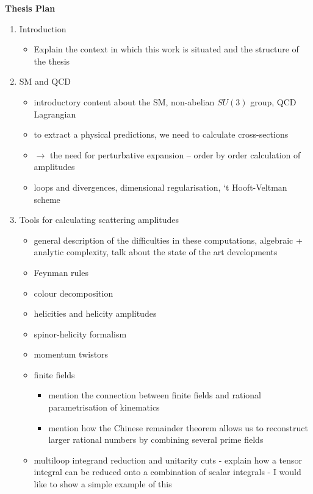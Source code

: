 \documentclass[main.tex]{subfiles}
\begin{document}
\centering
\textbf{Thesis Plan}
\begin{enumerate}
    \item Introduction
    \begin{itemize}
        \item Explain the context in which this work is situated and the structure of the thesis
    \end{itemize}
    \item SM and QCD
    \begin{itemize}
        \item introductory content about the SM, non-abelian $SU(3)$ group, QCD Lagrangian
        \item to extract a physical predictions, we need to calculate cross-sections
        \item $\rightarrow$ the need for perturbative expansion -- order by order calculation of amplitudes
        \item loops and divergences, dimensional regularisation, `t Hooft-Veltman scheme
    \end{itemize}
    \item Tools for calculating scattering amplitudes
    \begin{itemize}
        \item general description of the difficulties in these computations, algebraic + analytic complexity, talk about the state of the art developments
        \item Feynman rules
        \item colour decomposition
        \item helicities and helicity amplitudes
        \item spinor-helicity formalism
        \item momentum twistors
        \item finite fields
        \begin{itemize}
            \item mention the connection between finite fields and rational parametrisation of kinematics
            \item mention how the Chinese remainder theorem allows us to reconstruct larger rational numbers by combining several prime fields
        \end{itemize}
        \item multiloop integrand reduction and unitarity cuts - explain how a tensor integral can be reduced onto a combination of scalar integrals - I would like to show a simple example of this
       

\end{itemize}
\end{enumerate}
\end{document}

